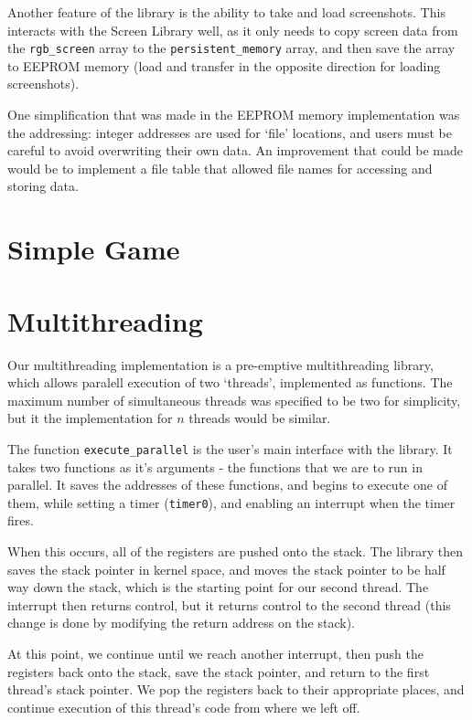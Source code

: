 \documentclass[a4paper,10pt]{article}
\begin{document}
Another feature of the library is the ability to take and load screenshots.
This interacts with the Screen Library well, as it only needs to copy screen
data from the \texttt{rgb\_screen} array to the \texttt{persistent\_memory}
array, and then save the array to EEPROM memory (load and transfer in the
opposite direction for loading screenshots).

One simplification that was made in the EEPROM memory implementation was the
addressing: integer addresses are used for `file' locations, and users must
be careful to avoid overwriting their own data. An improvement that could be
made would be to implement a file table that allowed file names for accessing
and storing data.

\section*{Simple Game}

\section*{Multithreading}

Our multithreading implementation is a pre-emptive multithreading library,
which allows paralell execution of two `threads', implemented as functions.
The maximum number of simultaneous threads was specified to be two for
simplicity, but it the implementation for $n$ threads would be similar.

The function \texttt{execute\_parallel} is the user's main interface with the
library. It takes two functions as it's arguments - the functions that we are
to run in parallel. It saves the addresses of these functions, and begins to
execute one of them, while setting a timer (\texttt{timer0}), and enabling an
interrupt when the timer fires.

When this occurs, all of the registers are pushed onto the stack. The library
then saves the stack pointer in kernel space, and moves the stack pointer to
be half way down the stack, which is the starting point for our second thread.
The interrupt then returns control, but it returns control to the second
thread (this change is done by modifying the return address on the stack).

At this point, we continue until we reach another interrupt, then push the
registers back onto the stack, save the stack pointer, and return to the first
thread's stack pointer. We pop the registers back to their appropriate places,
and continue execution of this thread's code from where we left off.
\end{document}

